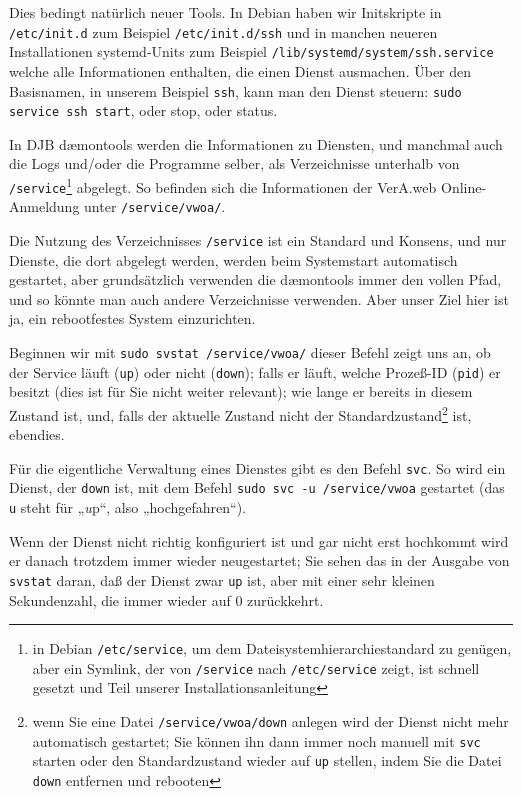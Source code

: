 \documentclass{tarentanleitung}
\begin{document}
Dies bedingt natürlich neuer Tools. In Debian haben wir Initskripte in
\texttt{/etc/init.d} \dash zum Beispiel \texttt{/etc/init.d/ssh} \dash
und in manchen neueren Installationen systemd-Units \dash zum Beispiel
\texttt{/lib/systemd/system/ssh.service} \dash welche alle Informationen
enthalten, die einen Dienst ausmachen. Über den Basisnamen, in unserem
Beispiel \texttt{ssh}, kann man den Dienst steuern: \texttt{sudo service
ssh start}, oder stop, oder status.

In DJB dæmontools werden die Informationen zu Diensten, und manchmal auch
die Logs und/oder die Programme selber, als Verzeichnisse unterhalb von
\texttt{/service}\Hair\footnote{in Debian \texttt{/etc/service}, um dem
Dateisystemhierarchiestandard zu genügen, aber ein Symlink, der von
\texttt{/service} nach \texttt{/etc/service} zeigt, ist schnell gesetzt
und Teil unserer Installationsanleitung} abgelegt. So befinden sich die
Informationen der VerA.web Online-Anmeldung unter \texttt{/service/vwoa/}.

Die Nutzung des Verzeichnisses \texttt{/service} ist ein Standard und
Konsens, und nur Dienste, die dort abgelegt werden, werden beim Systemstart
automatisch gestartet, aber grundsätzlich verwenden die dæmontools immer
den vollen Pfad, und so könnte man auch andere Verzeichnisse verwenden.
Aber unser Ziel hier ist ja, ein rebootfestes System einzurichten.

Beginnen wir mit \texttt{sudo svstat /service/vwoa/} \dash dieser Befehl
zeigt uns an, ob der Service läuft (\texttt{up}) oder nicht (\texttt{down});
falls er läuft, welche Prozeß-ID (\texttt{pid}) er besitzt (dies ist für
Sie nicht weiter relevant); wie lange er bereits in diesem Zustand ist,
und, falls der aktuelle Zustand nicht der Standardzustand\Hair\footnote
{wenn Sie eine Datei \texttt{/service/vwoa/down} anlegen wird der Dienst
nicht mehr automatisch gestartet; Sie können ihn dann immer noch manuell
mit \texttt{svc} starten oder den Standardzustand wieder auf \texttt{up}
stellen, indem Sie die Datei \texttt{down} entfernen und rebooten} ist,
ebendies.

Für die eigentliche Verwaltung eines Dienstes gibt es den Befehl
\texttt{svc}. So wird ein Dienst, der \texttt{down} ist, mit dem Befehl
\texttt{sudo svc -u /service/vwoa} gestartet (das \texttt{u} steht für
„\emph{u}p“, also „hochgefahren“).

Wenn der Dienst nicht richtig konfiguriert ist und gar nicht erst hochkommt
wird er danach trotzdem immer wieder neugestartet; Sie sehen das in der
Ausgabe von \texttt{svstat} daran, daß der Dienst zwar \texttt{up} ist,
aber mit einer sehr kleinen Sekundenzahl, die immer wieder auf 0 zurückkehrt.
\end{document}
